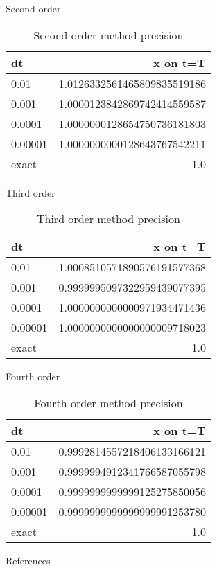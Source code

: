 \documentclass[10pt]{beamer}
\begin{document}
\begin{frame}{Second order}
  \begin{table}
    \caption{Second order method precision}
    \begin{tabular}{lr}
      \toprule
      dt & x on t=T\\
      \midrule
      0.01 & 1.0126332561465809835519186\\
      0.001 & 1.0000123842869742414559587\\
      0.0001 & 1.0000000128654750736181803\\
      0.00001 & 1.0000000000128643767542211\\
      \midrule
      exact & 1.0 \\
      \bottomrule
    \end{tabular}
  \end{table}
\end{frame}

\begin{frame}{Third order}
  \begin{table}
    \caption{Third order method precision}
    \begin{tabular}{lr}
      \toprule
      dt & x on t=T\\
      \midrule
      0.01 & 1.0008510571890576191577368\\
      0.001 & 0.9999995097322959439077395\\
      0.0001 & 1.0000000000000971934471436\\
      0.00001 & 1.0000000000000000009718023\\
      \midrule
      exact & 1.0 \\
      \bottomrule
    \end{tabular}
  \end{table}
\end{frame}

\begin{frame}{Fourth order}
  \begin{table}
    \caption{Fourth order method precision}
    \begin{tabular}{lr}
      \toprule
      dt & x on t=T\\
      \midrule
      0.01 & 0.9992814557218406133166121\\
      0.001 & 0.9999994912341766587055798\\
      0.0001 & 0.9999999999999125275850056\\
      0.00001 & 0.9999999999999999991253780\\
      \midrule
      exact & 1.0 \\
      \bottomrule
    \end{tabular}
  \end{table}
\end{frame}

\appendix

\begin{frame}[allowframebreaks]{References}
  
  
\end{frame}
\end{document}
